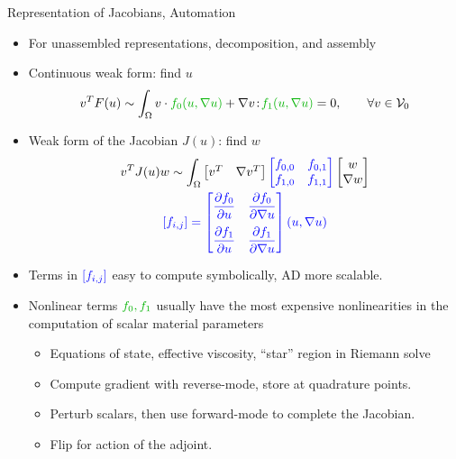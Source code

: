 \begin{frame}[shrink=5]{Representation of Jacobians, Automation}
  \begin{itemize}
  \item For unassembled representations, decomposition, and assembly
  \item Continuous weak form: find $u$
    \[ v^T F(u) \sim \int_\Omega v \cdot {\color{green!70!black} f_0(u,\nabla u)}
    + \nabla v \tcolon {\color{green!70!black} f_1(u,\nabla u)} = 0, \qquad \forall v \in \VV_0 \]
  \item Weak form of the Jacobian $J(u)$: find $w$
    \begin{gather*}
      v^T J(u) w \sim \int_\Omega \begin{bmatrix} v^T & \nabla v^T \end{bmatrix}
      {\color{blue} \begin{bmatrix} f_{0,0} & f_{0,1} \\ f_{1,0} & f_{1,1} \end{bmatrix}}
      \begin{bmatrix} w \\ \nabla w \end{bmatrix} \\
      {\color{blue} [f_{i,j}] = \begin{bmatrix} \dfrac{\partial f_0}{\partial u} & \dfrac{\partial f_0}{\partial \nabla u} \\[1em]
          \dfrac{\partial f_1}{\partial u} & \dfrac{\partial f_1}{\partial \nabla u} \end{bmatrix} (u,\nabla u) }
    \end{gather*}
  \item Terms in ${\color{blue} [f_{i,j}]}$ easy to compute symbolically, AD more scalable.
  \item Nonlinear terms ${\color{green!70!black}f_0,f_1}$ usually have the most expensive nonlinearities in the computation of scalar material parameters
    \begin{itemize}
    \item Equations of state, effective viscosity, ``star'' region in Riemann solve
    \item Compute gradient with reverse-mode, store at quadrature points.
    \item Perturb scalars, then use forward-mode to complete the Jacobian.
    \item Flip for action of the adjoint.
    \end{itemize}
  \end{itemize}
\end{frame}
